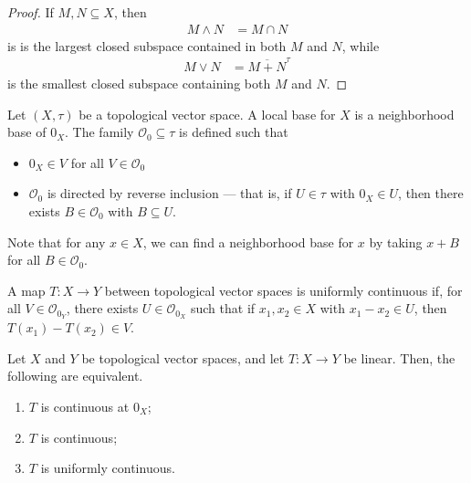 \documentclass[10pt]{mypackage}
\begin{document}
\begin{proof}
  If $M,N\subseteq X$, then
  \begin{align*}
    M\wedge N &= M\cap N
  \end{align*}
  is is the largest closed subspace contained in both $M$ and $N$, while
  \begin{align*}
    M\vee N &= \overline{M+N}^{\tau}
  \end{align*}
  is the smallest closed subspace containing both $M$ and $N$.
\end{proof}
\begin{definition}
  Let $\left(X,\tau\right)$ be a topological vector space. A local base for $X$ is a neighborhood base of $0_X$. The family $\mathcal{O}_{0}\subseteq \tau$ is defined such that
  \begin{itemize}
    \item $0_X\in V$ for all $V\in \mathcal{O}_{0}$
    \item $\mathcal{O}_{0}$ is directed by reverse inclusion --- that is, if $U\in \tau$ with $0_X\in U$, then there exists $B\in \mathcal{O}_{0}$ with $B\subseteq U$.
  \end{itemize}
  Note that for any $x\in X$, we can find a neighborhood base for $x$ by taking $x + B$ for all $B\in \mathcal{O}_0$.
\end{definition}
\begin{definition}
  A map $T: X\rightarrow Y$ between topological vector spaces is uniformly continuous if, for all $V\in \mathcal{O}_{0_Y}$, there exists $U\in \mathcal{O}_{0_{X}}$ such that if $x_1,x_2\in X$ with $x_1-x_2\in U$, then $T\left(x_1\right) - T\left(x_2\right)\in V$.
\end{definition}
\begin{proposition}
  Let $X$ and $Y$ be topological vector spaces, and let $T: X\rightarrow Y$ be linear. Then, the following are equivalent.
  \begin{enumerate}[(1)]
    \item $T$ is continuous at $0_X$;
    \item $T$ is continuous;
    \item $T$ is uniformly continuous.
  \end{enumerate}
\end{proposition}
\end{document}

